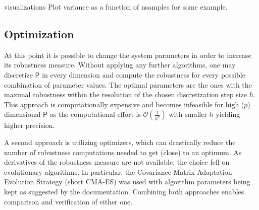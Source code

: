     

    visualizations
    Plot variance as a function of nsamples for some example. 

\subsection{Optimization}
    
    At this point it is possible to change the system parameters in order to increase its robustness measure.
     Without applying any further algorithms, one may discretize $\mathsf{P}$ in every dimension and compute the robustness for every possible combination of parameter values. The optimal parameters are the ones with the maximal robustness within the resolution of the chosen discretization step size $h$. This approach is computationally expensive and becomes infeasible for high ($p$) dimensional $\mathsf{P}$ as the computational effort is $\mathcal{O}(\frac{1}{h^d})$ with smaller $h$ yielding higher precision. 
    
    A second approach is utilizing optimizers, which can drastically reduce the number of robustness computations needed to get (close) to an optimum. As derivatives of the robustness measure are not available, the choice fell on evolutionary algorithms. In particular, the Covariance Matrix Adaptation Evolution Strategy (short CMA-ES) was used with algorithm parameters being kept as suggested by the documentation. Combining both approaches enables comparison and verification of either one. 



